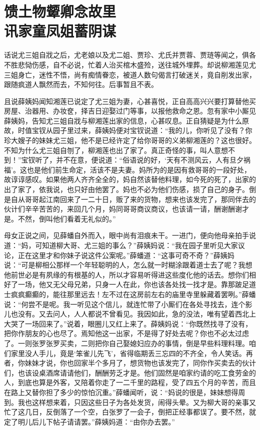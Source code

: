 
\chapter{馈土物颦卿念故里\\讯家童凤姐蓄阴谋}
话说尤三姐自戕之后，尤老娘以及尤二姐、贾珍、尤氏并贾蓉、贾琏等闻之，俱各不胜悲恸伤感，自不必说，忙着人治买棺木盛殓，送往城外埋葬。却说柳湘莲见尤三姐身亡，迷性不悟，尚有痴情眷恋，被道人数句偈言打破迷关，竟自削发出家，跟随疯道人飘然而去，不知何往。后事暂且不表。

且说薛姨妈闻知湘莲已说定了尤三姐为妻，心甚喜悦，正自高高兴兴要打算替他买房屋、治器用、办妆奁，择吉日迎娶过门等事，以报他救命之恩。忽有家中小厮见薛姨妈，告知尤三姐自戕与柳湘莲出家的信息，心甚叹息。正自猜疑是为什么原故，时值宝钗从园子里过来，薛姨妈便对宝钗说道：``我的儿，你听见了没有？你珍大嫂子的妹妹尤三姐，他不是已经许定了给你哥哥的义弟柳湘莲的？这也很好。不知为什么尤三姐自刎了，柳湘莲也出了家了。真正奇怪的事，叫人意想不到！''宝钗听了，并不在意，便说道：``俗语说的好，`天有不测风云，人有旦夕祸福'。这也是他们前生命定，活该不是夫妻。妈所为的是因有救哥哥的一段好处，故谆谆感叹。如果他两人齐齐全全的，妈自然该替他料理，如今死的死了，出家的出了家了，依我说，也只好由他罢了。妈也不必为他们伤感，损了自己的身子。倒是自从哥哥起江南回来了一二十日，贩了来的货物，想来也该发完了，那同伴去的伙计们辛辛苦苦的，来回几个月，妈同哥哥商议商议，也该请一请，酬谢酬谢才是。不然，倒叫他们看着无礼似的。''

母女正说之间，见薛蟠自外而入，眼中尚有泪痕未干。一进门，便向他母亲拍手说道：``妈，可知道柳大哥、尤三姐的事么？''薛姨妈说：``我在园子里听见大家议论，正在这里才和你妹子说这件公案呢。''薛蟠道：``这事可奇不奇？''薛姨妈说：``可是柳相公那样一个年轻聪明的人，怎么就一时糊涂跟着道士去了呢？我想他前世必是有夙缘的有根基的人，所以才容易听得进这些度化他的话去。想你们相好了一场，他又无父母兄弟，只身一人在此，你也该各处找一找才是。靠那跛足道士疯疯癫癫的，能往那里远去！左不过在这房前左右的庙里寺里躲藏着罢咧。''薛蟠说：``何尝不是呢。我一听见这个信儿，就连忙带了小厮们在各处寻找去，连个影儿也没有。又去问人，人人都说不曾看见。我因如此，急的没法，唯有望着西北上大哭了一场回来了。''说着，眼圈儿又红上来了。薛姨妈说：``你既然找寻了没有，把你作朋友的心也尽了。焉知他这一出家，不是得了好处去呢？你也不必太过虑了。一则张罗张罗买卖，二则把你自己娶媳妇应办的事情，倒是早些料理料理。咱们家里没人手儿，竟是`笨雀儿先飞'，省得临期丢三忘四的不齐全，令人笑话。再者，你妹妹才说，你也回家半个多月了，想货物也该发完了，同你作买卖去的伙计们，也该设桌酒席请请他们，酬酬劳乏才是。他们固然是咱家约请的吃工食劳金的人，到底也算是外客，又陪着你走了一二千里的路程，受了四五个月的辛苦，而且在路上又替你担了多少的惊怕沉重。''薛蟠闻听，说：``妈说的很是，妹妹想得周到。我也这样想来着，只因这些日子为各处发货，闹得头晕。又为柳大哥的亲事又忙了这几日，反倒落了一个空，白张罗了一会子，倒把正经事都误了。要不然，就定了明儿后儿下帖子请请罢。''薛姨妈道：``由你办去罢。''

